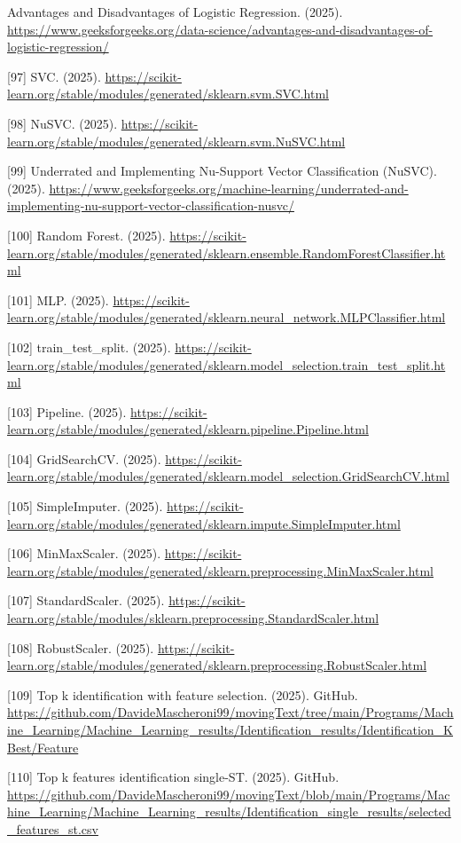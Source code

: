 \documentclass[12pt]{report}
\begin{document}
\begin{raggedright}
[96] Advantages and Disadvantages of Logistic Regression. (2025). \url{https://www.geeksforgeeks.org/data-science/advantages-and-disadvantages-of-logistic-regression/}

[97] SVC. (2025). \url{https://scikit-learn.org/stable/modules/generated/sklearn.svm.SVC.html}

[98] NuSVC. (2025). \url{https://scikit-learn.org/stable/modules/generated/sklearn.svm.NuSVC.html}

[99] Underrated and Implementing Nu-Support Vector Classification (NuSVC). (2025). \url{https://www.geeksforgeeks.org/machine-learning/underrated-and-implementing-nu-support-vector-classification-nusvc/}

[100] Random Forest. (2025). \url{https://scikit-learn.org/stable/modules/generated/sklearn.ensemble.RandomForestClassifier.html}

[101] MLP. (2025). \url{https://scikit-learn.org/stable/modules/generated/sklearn.neural_network.MLPClassifier.html}

[102] train\_test\_split. (2025). \url{https://scikit-learn.org/stable/modules/generated/sklearn.model_selection.train_test_split.html}

[103] Pipeline. (2025). \url{https://scikit-learn.org/stable/modules/generated/sklearn.pipeline.Pipeline.html}

[104] GridSearchCV. (2025). \url{https://scikit-learn.org/stable/modules/generated/sklearn.model_selection.GridSearchCV.html}

[105] SimpleImputer. (2025). \url{https://scikit-learn.org/stable/modules/generated/sklearn.impute.SimpleImputer.html}

[106] MinMaxScaler. (2025). \url{https://scikit-learn.org/stable/modules/generated/sklearn.preprocessing.MinMaxScaler.html}

[107] StandardScaler. (2025). \url{https://scikit-learn.org/stable/modules/sklearn.preprocessing.StandardScaler.html}

[108] RobustScaler. (2025). \url{https://scikit-learn.org/stable/modules/generated/sklearn.preprocessing.RobustScaler.html}

[109] Top k identification with feature selection. (2025). GitHub. \url{https://github.com/DavideMascheroni99/movingText/tree/main/Programs/Machine_Learning/Machine_Learning_results/Identification_results/Identification_KBest/Feature}

[110] Top k features identification single-ST. (2025). GitHub. \url{https://github.com/DavideMascheroni99/movingText/blob/main/Programs/Machine_Learning/Machine_Learning_results/Identification_single_results/selected_features_st.csv}


\end{raggedright}
\end{document}
